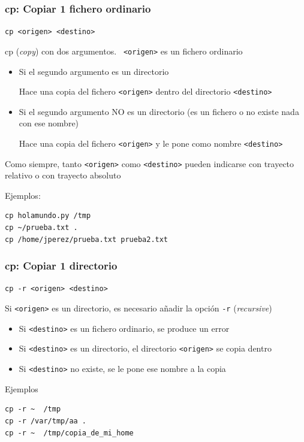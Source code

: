 \documentclass[ucs]{beamer}
\begin{document}

\begin{frame}[fragile]
\frametitle{cp: Copiar 1 fichero ordinario }
      \verb|cp <origen> <destino>|

cp (\emph{copy}) con dos argumentos.  \verb| <origen>| es un fichero ordinario

  \begin{itemize}
    \item Si el segundo argumento es un directorio

        Hace una copia del fichero \verb|<origen>| dentro del directorio \verb|<destino>| 


    \item Si el segundo argumento NO es un directorio (es un fichero o no existe nada con ese nombre)

        Hace una copia del fichero \verb|<origen>| y le pone como nombre \verb|<destino>| 
  \end{itemize}

Como siempre, tanto 
\verb|<origen>|
como
\verb|<destino>|
pueden indicarse con trayecto relativo o con trayecto absoluto


Ejemplos:

  \begin{footnotesize}
  \begin{verbatim}
cp holamundo.py /tmp
cp ~/prueba.txt .
cp /home/jperez/prueba.txt prueba2.txt
  \end{verbatim}
  \end{footnotesize}

\end{frame}





\begin{frame}[fragile]
\frametitle{cp: Copiar 1 directorio }
  
      \verb|cp -r <origen> <destino>|

Si \verb|<origen>|
es un directorio, es necesario añadir la opción \verb|-r| (\emph{recursive})


\begin{itemize}
\item
Si \verb|<destino>| es un fichero ordinario, se produce un error
\item
Si \verb|<destino>| es un directorio, el directorio \verb|<origen>| se copia dentro
\item
Si \verb|<destino>| no existe, se le pone ese nombre a la copia 
\end{itemize}

Ejemplos
  \begin{footnotesize}
  \begin{verbatim}
cp -r ~  /tmp
cp -r /var/tmp/aa .
cp -r ~  /tmp/copia_de_mi_home
  \end{verbatim}
  \end{footnotesize}

\end{frame}
\end{document}
